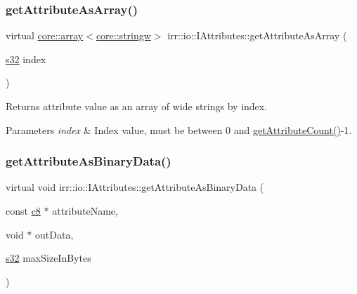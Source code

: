 \subsubsection{\texorpdfstring{get\+Attribute\+As\+Array()}{getAttributeAsArray()}\hspace{0.1cm}{\footnotesize\ttfamily [4/4]}}
{\footnotesize\ttfamily virtual \hyperlink{classirr_1_1core_1_1array}{core\+::array}$<$\hyperlink{namespaceirr_1_1core_a5aedb62cb47cf01d1c548ab5e6344d2d}{core\+::stringw}$>$ irr\+::io\+::\+I\+Attributes\+::get\+Attribute\+As\+Array (\begin{DoxyParamCaption}\item[{\hyperlink{namespaceirr_ac66849b7a6ed16e30ebede579f9b47c6}{s32}}]{index }\end{DoxyParamCaption})\hspace{0.3cm}{\ttfamily [pure virtual]}}



Returns attribute value as an array of wide strings by index. 


\begin{DoxyParams}{Parameters}
{\em index} & Index value, must be between 0 and \hyperlink{classirr_1_1io_1_1IAttributes_a796bdd9440ee7ba0b6742a90a82870b6}{get\+Attribute\+Count()}-\/1. \\
\hline
\end{DoxyParams}
\mbox{\label{classirr_1_1io_1_1IAttributes_acfb2d9c332942601f2e9757ddd8f999a}} 
\subsubsection{\texorpdfstring{get\+Attribute\+As\+Binary\+Data()}{getAttributeAsBinaryData()}\hspace{0.1cm}{\footnotesize\ttfamily [1/4]}}
{\footnotesize\ttfamily virtual void irr\+::io\+::\+I\+Attributes\+::get\+Attribute\+As\+Binary\+Data (\begin{DoxyParamCaption}\item[{const \hyperlink{namespaceirr_a9395eaea339bcb546b319e9c96bf7410}{c8} $\ast$}]{attribute\+Name,  }\item[{void $\ast$}]{out\+Data,  }\item[{\hyperlink{namespaceirr_ac66849b7a6ed16e30ebede579f9b47c6}{s32}}]{max\+Size\+In\+Bytes }\end{DoxyParamCaption})\hspace{0.3cm}{\ttfamily [pure virtual]}}



